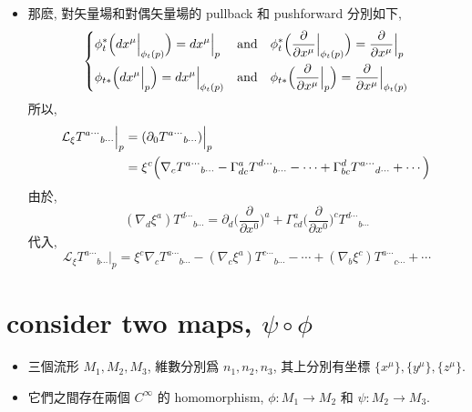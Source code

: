 \begin{itemize}
\begin{tcolorbox}[title=proof:]
\begin{itemize}
			\item 那麽, 對矢量場和對偶矢量場的 pullback 和 pushforward 分別如下, 
			\begin{equation}
				\begin{dcases}
					\phi^*_t \Big( dx^\mu \Big|_{\phi_t(p)} \Big) = dx^\mu \Big|_p & \text{and} \quad \phi^*_t \Big( \frac{\partial}{\partial x^\mu} \Big|_{\phi_t(p)} \Big) = \frac{\partial}{\partial x^\mu} \Big|_p \\
					\phi_{t *} \Big( dx^\mu \Big|_p \Big) = dx^\mu \Big|_{\phi_t(p)} & \text{and} \quad \phi_{t *} \Big( \frac{\partial}{\partial x^\mu} \Big|_p \Big) = \frac{\partial}{\partial x^\mu} \Big|_{\phi_t(p)}
				\end{dcases}
			\end{equation}
			所以,
			\begin{align}
				\mathcal{L}_\xi {T^{a \cdots}}_{b \cdots} \Big|_p &= (\partial_0 {T^{a \cdots}}_{b \cdots}) \Big|_p \notag \\
				&= \xi^c \Big( \nabla_c {T^{a \cdots}}_{b \cdots} - \Gamma^a_{d c} {T^{d \cdots}}_{b \cdots} - \cdots + \Gamma^d_{b c} {T^{a \cdots}}_{d \cdots} + \cdots \Big)
			\end{align}
			由於,
			\begin{equation}
				(\nabla_d \xi^a) {T^{d \cdots}}_{b \cdots} = \partial_d \Big( \frac{\partial}{\partial x^0} \Big)^a + \Gamma^a_{c d} \Big( \frac{\partial}{\partial x^0} \Big)^c {T^{d \cdots}}_{b \cdots}
			\end{equation}
			代入,
			\begin{equation}
				\mathcal{L}_\xi {T^{a \cdots}}_{b \cdots} \Big|_p = \xi^c \nabla_c {T^{a \cdots}}_{b \cdots} - (\nabla_c \xi^a) {T^{c \cdots}}_{b \cdots} - \cdots + (\nabla_b \xi^c) {T^{a \cdots}}_{c \cdots} + \cdots
			\end{equation}
		\end{itemize}
	\end{tcolorbox}
\end{itemize}

\section{consider two maps, \texorpdfstring{$\psi \circ \phi$}{psi circ phi}}
\begin{itemize}
	\item 三個流形 $M_1, M_2, M_3$, 維數分別爲 $n_1, n_2, n_3$, 其上分別有坐標 $\{ x^\mu \}, \{ y^\mu \}, \{ z^\mu \}$.
	
	\item 它們之間存在兩個 $C^\infty$ 的 homomorphism, $\phi : M_1 \rightarrow M_2$ 和 $\psi : M_2 \rightarrow M_3$.
\end{itemize}


